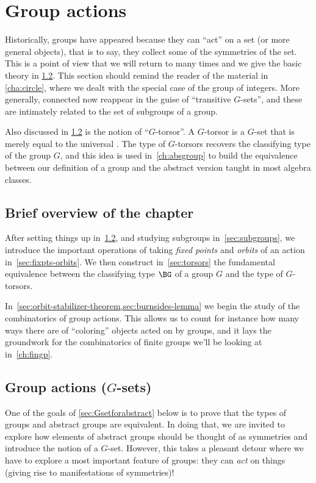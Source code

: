 \chapter{Group actions}
\label{ch:actions}

Historically, groups have appeared because they can ``act'' on a set
(or more general objects), that is to say, they collect some of the
symmetries of the set. This is a point of view that we will return to
many times and we give the basic theory in \cref{sec:gsets}.
This section should remind the reader of the material in \cref{cha:circle},
where we dealt with the special case of the group of integers.
More generally, connected \coverings now reappear in the guise of
``transitive $G$-sets'', and these are intimately related to
the set of subgroups of a group.

Also discussed in \cref{sec:gsets} is the notion of ``$G$-torsor''.
A $G$-torsor is a $G$-set that is merely equal to the universal \covering.
The type of $G$-torsors recovers the classifying type of the group $G$,
and this idea is used in~\cref{ch:absgroup} to build the equivalence between our definition of a group and the abstract version taught in most algebra classes.

\section{Brief overview of the chapter}

After setting things up in~\cref{sec:gsets}, and
studying subgroups in~\cref{sec:subgroups},
we introduce the important
operations of taking \emph{fixed points} and \emph{orbits} of an action
in~\cref{sec:fixpts-orbits}.
We then construct in~\cref{sec:torsors}
the fundamental equivalence between the classifying type $\BG$ of a group $G$
and the type of $G$-torsors.

In~\cref{sec:orbit-stabilizer-theorem,sec:burnsides-lemma} we
begin the study of the combinatorics of group actions.
This allows us to count for instance how many ways there are of ``coloring''
objects acted on by groups,
and it lays the groundwork for the combinatorics of finite groups
we'll be looking at in~\cref{ch:fingp}.

\section{Group actions ($G$-sets)}
\label{sec:gsets}

One of the goals of \cref{sec:Gsetforabstract} below
is to prove that the types of groups and abstract groups are equivalent.
In doing that, we are invited to explore how elements of
abstract groups should be
thought of as symmetries and introduce the notion of a $G$-set.
However, this takes a pleasant detour where we have to explore a
most important feature of groups: they can \emph{act} on things
(giving rise to manifestations of symmetries)!


